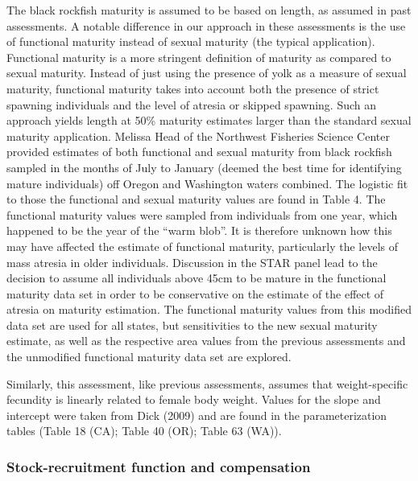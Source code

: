 \documentclass[11pt,
  english,
  letterpaper,
]{article}
\begin{document}
The black rockfish maturity is assumed to be based on length, as assumed in past assessments. A notable difference in our approach in these assessments is the use of functional maturity instead of sexual maturity (the typical application). Functional maturity is a more stringent definition of maturity as compared to sexual maturity. Instead of just using the presence of yolk as a measure of sexual maturity, functional maturity takes into account both the presence of strict spawning individuals and the level of atresia or skipped spawning. Such an approach yields length at 50\% maturity estimates larger than the standard sexual maturity application. Melissa Head of the Northwest Fisheries Science Center provided estimates of both functional and sexual maturity from black rockfish sampled in the months of July to January (deemed the best time for identifying mature individuals) off Oregon and Washington waters combined. The logistic fit to those the functional and sexual maturity values are found in Table 4. The functional maturity values were sampled from individuals from one year, which happened to be the year of the ``warm blob''. It is therefore unknown how this may have affected the estimate of functional maturity, particularly the levels of mass atresia in older individuals. Discussion in the STAR panel lead to the decision to assume all individuals above 45cm to be mature in the functional maturity data set in order to be conservative on the estimate of the effect of atresia on maturity estimation. The functional maturity values from this modified data set are used for all states, but sensitivities to the new sexual maturity estimate, as well as the respective area values from the previous assessments and the unmodified functional maturity data set are explored.

Similarly, this assessment, like previous assessments, assumes that weight-specific fecundity is linearly related to female body weight. Values for the slope and intercept were taken from Dick (2009) and are found in the parameterization tables (Table 18 (CA); Table 40 (OR); Table 63 (WA)).

\hypertarget{stock-recruitment-function-and-compensation}{%
\subsubsection{Stock-recruitment function and compensation}\label{stock-recruitment-function-and-compensation}}
\end{document}
